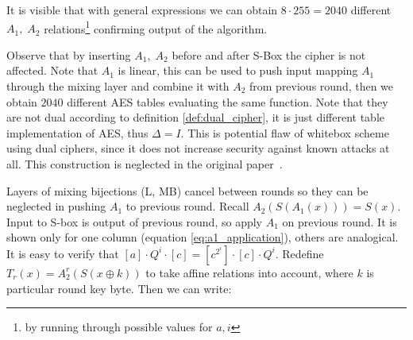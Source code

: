\documentclass[11pt,oneside,final]{fithesis2}
\begin{document}
	It is visible that with general expressions we can obtain $8 \cdot 255 = 2040$ different 
	$A_1,\;A_2$ relations\footnote{by running through possible values for $a,i$ } confirming output of the algorithm. 
	
	Observe that by inserting $A_1,\;A_2$ before and after S-Box the cipher is not affected. Note that $A_1$ is linear, this can be used to 
	push input mapping $A_1$ through the mixing layer and combine it with $A_2$ from previous round, then we obtain $2040$ different AES 
	tables evaluating the same function. Note that they are not dual according to definition \ref{def:dual_cipher}, it is just different 
	table implementation of AES, thus $\Delta = I$. This is potential flaw of whitebox scheme using dual ciphers, since it does not increase
	security against known attacks at all. This construction is neglected in the original paper~\citep{Karroumi:2010:PWA:2041036.2041060}.
	
	Layers of mixing bijections (L, MB) cancel between rounds so they can be neglected in pushing $A_1$ to previous round. 
	Recall $A_2\left(S\left(A_1\left(x\right)\right)\right) = S(x)$. Input to S-box is output of previous round, so apply $A_1$ on previous round.
	It is shown only for one column (equation \ref{eq:a1_application}), others are analogical. It is easy to verify that 
	$\left[a\right] \cdot Q^i \cdot \left[c\right] = \left[c^{2^{i}}\right] \cdot \left[c\right] \cdot Q^i$. 
	Redefine $T_r(x) = A_2^r(S(x \oplus k))$ to take affine relations into account, where $k$ is particular round key byte. Then we can write:

	
\end{document}
